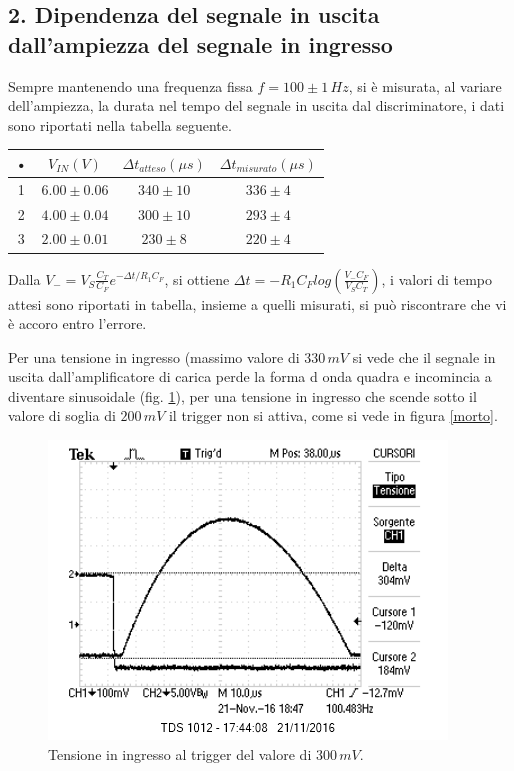 \documentclass[10pt,a4paper]{article}
\begin{document}
\subsection*{2. Dipendenza del segnale in uscita dall'ampiezza del segnale in ingresso}

Sempre mantenendo una frequenza fissa $f = 100 \pm 1 \, Hz$, si è misurata, al variare dell'ampiezza, la durata nel tempo del segnale in uscita dal discriminatore, i dati sono riportati nella tabella seguente.

\begin{table}[!ht]
\centering
\begin{tabular}{|c|c|c|c|}
\hline 
• & $V_{IN} (V)$ & $\Delta t _ {atteso} (\mu s)$ & $\Delta t _ {misurato} (\mu s)$ \\ 
\hline 
1 & $6.00 \pm 0.06$ & $340 \pm 10$ & $336 \pm 4$ \\ 
\hline 
2 & $4.00 \pm 0.04$ & $300 \pm 10$ & $293 \pm 4$ \\ 
\hline 
3 & $2.00 \pm 0.01$ & $230 \pm 8$ & $220 \pm 4$ \\ 
\hline 
\end{tabular} 
\end{table}

Dalla $V_-=V_S \frac{C_T}{C_F} e^{- \Delta t/R_1 C_F}$, si ottiene $\Delta t = -R_1 C_F log\left( \frac{V_- C_F}{V_S C_T}\right)$, i valori di tempo attesi sono riportati in tabella, insieme a quelli misurati, si può riscontrare che vi è accoro entro l'errore.

Per una tensione in ingresso (massimo valore di $330 \, mV$ si vede che il segnale in uscita dall'amplificatore di carica perde la forma d onda quadra e incomincia a diventare sinusoidale (fig. \ref{inizamorire}), per una tensione in ingresso che scende sotto il valore di soglia di $200 \, mV$ il trigger non si attiva, come si vede in figura \ref{morto}.

\begin{figure}[h]
\centering
\includegraphics[scale=1.0]{immagini/iniziaamorire.png}
\caption{Tensione in ingresso al trigger del valore di $300 \, mV$.}
\label{inizamorire}
\end{figure}
\end{document}
